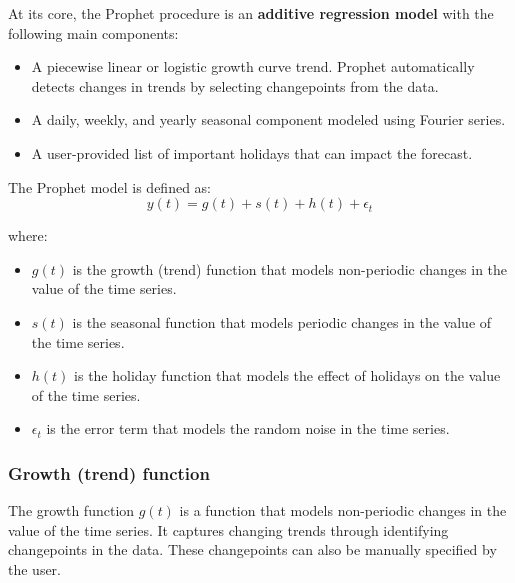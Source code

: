 At its core, the Prophet procedure is an \textbf{additive regression model} with the 
following main components:
\begin{itemize}
    \item A piecewise linear or logistic growth curve trend. Prophet automatically detects
    changes in trends by selecting changepoints from the data.
    \item A daily, weekly, and yearly seasonal component modeled using Fourier series.
    \item A user-provided list of important holidays that can impact the forecast.
\end{itemize}

The Prophet model is defined as:
$$y(t) = g(t) + s(t) + h(t) + \epsilon_t$$

where:
\begin{itemize}
    \item $g(t)$ is the growth (trend) function that models non-periodic changes in the value of
    the time series.
    \item $s(t)$ is the seasonal function that models periodic changes in the value of
    the time series.
    \item $h(t)$ is the holiday function that models the effect of holidays on the value
    of the time series.
    \item $\epsilon_t$ is the error term that models the random noise in the time series.
\end{itemize}

\subsubsection{Growth (trend) function}

The growth function $g(t)$ is a function that models non-periodic changes in the
value of the time series. It captures changing trends through identifying changepoints in
the data. These changepoints can also be manually specified by the user.\\

